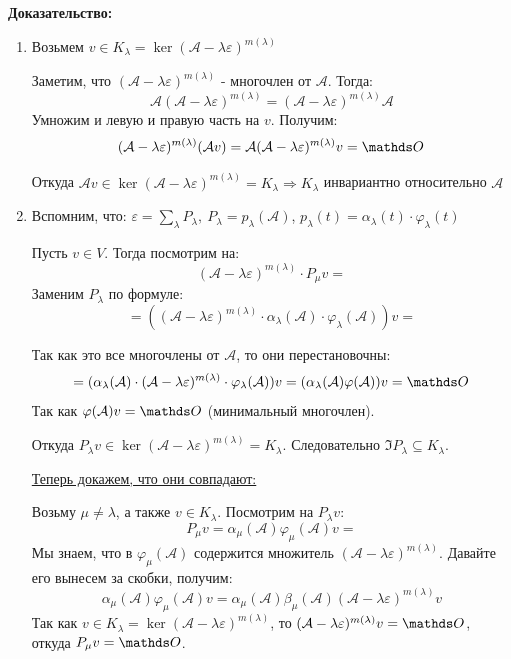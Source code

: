 \textbf{Доказательство:}
\begin{enumerate}
    \item Возьмем $v \in K_{\lambda} = \ker(\mathcal{A} - \lambda \varepsilon)^{m(\lambda)} $

    Заметим, что $(\mathcal{A} - \lambda \varepsilon)^{m(\lambda)}$  - многочлен от $\mathcal{A}$. Тогда:
    $$\mathcal{A}(\mathcal{A} - \lambda \varepsilon)^{m(\lambda)} = (\mathcal{A} - \lambda \varepsilon)^{m(\lambda)} \mathcal{A}$$
    Умножим и левую и правую часть на $v$. Получим:
    $$(\mathcal{A} - \lambda \varepsilon)^{m(\lambda)}(\mathcal{A}v)=\mathcal{A}(\mathcal{A} -\lambda \varepsilon)^{m(\lambda)}v = \zero$$


    Откуда $ \mathcal{A} v \in \ker(\mathcal{A} -\lambda \varepsilon)^{m(\lambda)} = K _{\lambda} \Rightarrow K_{\lambda} $ инвариантно относительно $\mathcal{A}$

    \item Вспомним, что: $\varepsilon = \sum\limits_{\lambda}P_{\lambda}, \ P_{\lambda }= p_{\lambda}(\mathcal{A})$, $p_{\lambda}(t)=\alpha_{\lambda}(t) \cdot \varphi_{\lambda}(t)$

    Пусть $v \in V$. Тогда посмотрим на:
     $$( \mathcal{A}-\lambda \varepsilon)^{m(\lambda)} \cdot P_{\mu}v = $$
    Заменим $P_{\lambda}$ по формуле:
    $$= ((\mathcal{A} -\lambda \varepsilon)^{m(\lambda)} \cdot \alpha_{\lambda}(\mathcal{A})\cdot \varphi_{\lambda}(\mathcal{A}))v =$$

    Так как это все многочлены от $\mathcal{A}$, то они перестановочны:
    $$ = (\alpha_{\lambda}(\mathcal{A})\cdot (\mathcal{A}-\lambda \varepsilon)^{m(\lambda)} \cdot \varphi_{\lambda}(\mathcal{A}))v = (\alpha_{\lambda}(\mathcal{A})\varphi(\mathcal{A}))v= \zero$$
    Так как $\varphi(\mathcal{A}) v = \zero$ (минимальный многочлен).



    Откуда $ P_{\lambda}v \in \ker (\mathcal{A}-\lambda \varepsilon)^{m(\lambda)} = K_{\lambda}$. Следовательно $ \Im P_{\lambda} \subseteq K_{\lambda}$.



    \uline{Теперь докажем, что они совпадают:}

    Возьму $\mu \ne \lambda$, а также $v \in K_{\lambda}$.  Посмотрим на $P_{\lambda}v$:
$$P_{\mu}v= \alpha_{\mu}(\mathcal{A})\varphi_{\mu}(\mathcal{A})v =$$
 Мы знаем, что в $\varphi_\mu(\mathcal{A})$ содержится множитель $(\mathcal{A}-\lambda\varepsilon)^{m(\lambda)}$. Давайте его вынесем за скобки, получим:
 $$\alpha_{\mu}(\mathcal{A})\varphi_{\mu}(\mathcal{A})v =\alpha_{\mu}(\mathcal{A})\beta_{\mu}(\mathcal{A})(\mathcal{A} -\lambda \varepsilon)^{m(\lambda)}v$$
 Так как $v \in K_{\lambda} = \ker (\mathcal{A}-\lambda \varepsilon)^{m(\lambda)}$, то $ (\mathcal{A}-\lambda \varepsilon)^{m(\lambda)}v = \zero$, откуда $P_{\mu}v = \zero$.


\end{enumerate}
